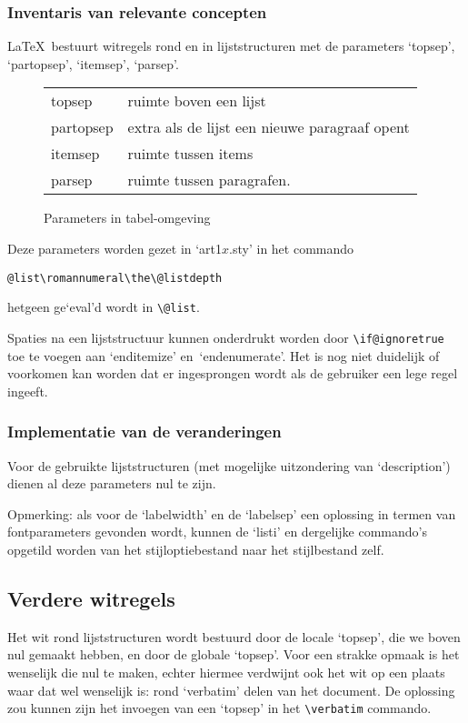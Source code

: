 \documentclass[a4paper]{artikel1} %
\begin{document}
\subsubsection{Inventaris van relevante concepten}
\LaTeX\ bestuurt witregels rond en in lijststructuren met de
parameters `topsep', `partopsep', `itemsep', `parsep'.
\begin{figure}[hb]
  \begin{center}
    \begin{tabular}{ll}
      topsep      &  ruimte boven een lijst\\
      partopsep   &  extra als de lijst een nieuwe paragraaf opent\\
      itemsep     &  ruimte  tussen items\\
      parsep      &  ruimte tussen paragrafen.\\
    \end{tabular}
  \end{center}
  \caption{Parameters in tabel-omgeving}
\end{figure}
Deze parameters worden gezet in `art1$x$.sty' in het commando
\begin{verbatim}
@list\romannumeral\the\@listdepth
\end{verbatim}
hetgeen ge`eval'd wordt in \verb.\@list..
 
Spaties na een lijststructuur kunnen onderdrukt worden door
\verb.\if@ignoretrue. toe te voegen aan `enditemize'
en~`endenumerate'. Het is nog niet duidelijk of voorkomen kan worden
dat er ingesprongen wordt als de gebruiker een lege regel ingeeft.
 
 
\subsubsection{Implementatie van de veranderingen}
Voor de gebruikte lijststructuren (met mogelijke uitzondering van
`description') dienen al deze parameters nul te zijn.
 
Opmerking: als voor de `labelwidth' en de `labelsep' een oplossing in
termen van fontparameters gevonden wordt, kunnen de `listi' en
dergelijke commando's opgetild worden van het stijloptiebestand naar
het stijlbestand zelf.
 
 
\subsection{Verdere witregels}
Het wit rond lijststructuren wordt bestuurd door de locale `topsep',
die we boven nul gemaakt hebben, en door de globale `topsep'.  Voor
een strakke opmaak is het wenselijk die nul te maken, echter hiermee
verdwijnt ook het wit op een plaats waar dat wel wenselijk is: rond
`verbatim' delen van het document. De oplossing zou kunnen zijn het
invoegen van een `topsep' in het \verb.\verbatim.  commando.
 
\end{document}
